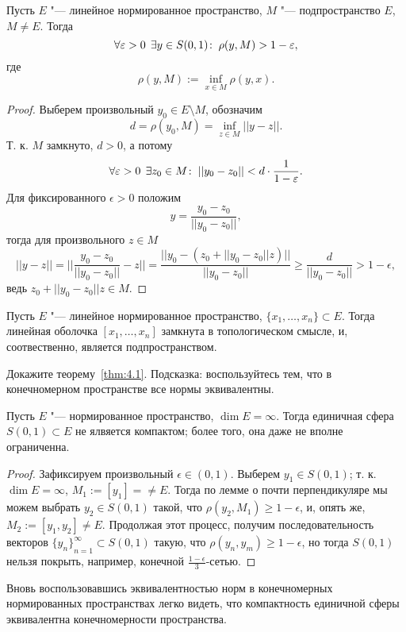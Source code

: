 \documentclass[main]{subfiles}
\begin{document}
\begin{lemma}
  Пусть \( E \) "--- линейное нормированное пространство,
  \( M \) "--- подпространство \( E \),
  \( M \ne E \).
  Тогда
  \[
    \forall {\varepsilon> 0} \; \,
    \exists y \in S(0, 1) \colon \:
    \rho(y, M) > 1 - \varepsilon,
  \]
  где
  \[
    \rho(y, M) := \inf_{x \in M} \rho(y, x).
  \]
\end{lemma}
\begin{proof}
  Выберем произвольный \( y_0 \in E \setminus M \),
  обозначим \[ d = \rho(y_0, M) = \inf_{z \in M} ||y - z||. \]
  Т. к. \( M \) замкнуто, \( d > 0 \), а потому
  \[ \forall {\varepsilon> 0} \; \, \exists z_0 \in M \colon \: ||y_0 - z_0|| <
  d \cdot \frac{1}{1 - \varepsilon}. \]
  Для фиксированного \( \epsilon > 0 \)
  положим
  \[ y = \frac{y_0 - z_0}{||y_0 - z_0||}, \]
  тогда для произвольного \( z \in M \)
  \[
    ||y - z|| =
    ||\frac{y_0 - z_0}{||y_0 - z_0||} - z|| =
    \frac{
      ||y_0 - (z_0 + ||y_0 - z_0|| z)||
    }{||y_0 - z_0||}
  \ge \frac{d}{||y_0 - z_0||} > 1 - \epsilon, \]
  ведь \( z_0 + ||y_0 - z_0|| z \in M \).
\end{proof}

\begin{theorem}\label{thm:4.1}
  Пусть \( E \) "--- линейное нормированное пространство,
  \( \{ x_1, \dots, x_n \} \subset E \).
  Тогда линейная оболочка \( [x_1, \dots, x_n] \) замкнута в топологическом
  смысле, и, соотвественно, является подпространством.
\end{theorem}
\begin{exercise}
  Докажите теорему~\ref{thm:4.1}.
  Подсказка: воспользуйтесь тем, что в конечномерном пространстве
  все нормы эквивалентны.
\end{exercise}

\begin{theorem}[Ф. Рисс]
  Пусть \( E \) "--- нормированное пространство,
  \( \dim E = \infty \).
  Тогда единичная сфера \( S(0, 1) \subset E \)
  не ялвяется компактом; более того,
  она даже не вполне ограниченна.
\end{theorem}
\begin{proof}
  Зафиксируем произвольный \( \epsilon \in (0, 1) \).
  Выберем \( y_1 \in S(0, 1) \);
  т. к. \( \dim E = \infty \),
  \( M_1 := [y_1] = \ne E \).
  Тогда по лемме о почти перпендикуляре
  мы можем выбрать \( y_2 \in S(0, 1) \) такой,
  что \( \rho(y_2, M_1) \ge 1 - \epsilon \),
  и, опять же, \( M_2 := [y_1, y_2] \ne E \).
  Продолжая этот процесс, получим
  последовательность векторов
  \( {\{ y_n \}}_{n = 1}^\infty \subset S(0, 1) \)
  такую, что
  \( \rho(y_n, y_m) \ge 1 - \epsilon \),
  но тогда \( S(0, 1) \) нельзя покрыть,
  например,
  конечной \( \frac{1 - \epsilon}3 \)-сетью.
\end{proof}

\begin{remark}
  Вновь воспользовавшись эквивалентностью норм
  в конечномерных нормированных пространствах
  легко видеть, что
  компактность единичной сферы эквивалентна
  конечномерности пространства.
\end{remark}
\end{document}

